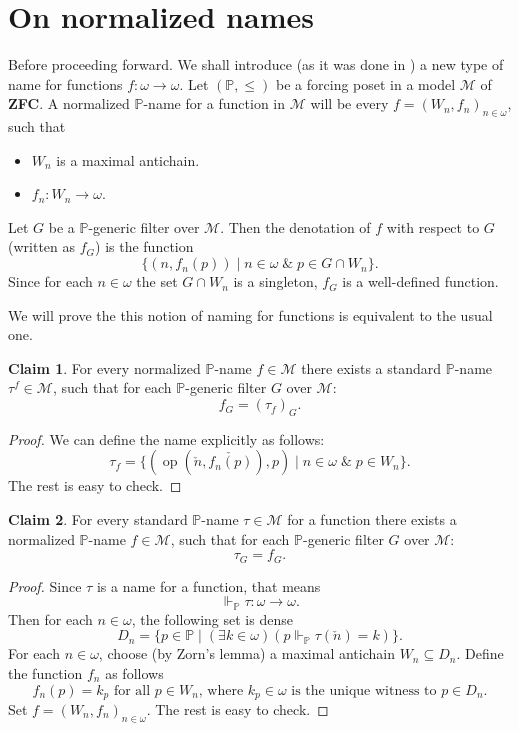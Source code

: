 \documentclass[12pt]{article}\usepackage[english]{babel}
\newcommand{\bbP}{\mathbb{P}}
\newcommand{\logand}{\; \& \;}
\newcommand{\calM}{\mathcal{M}}
\theoremstyle{definition}
\newtheorem{claim}{Claim}
\theoremstyle{remark}
\begin{document}
\newpage

\section*{On normalized names}

Before proceeding forward.
We shall introduce (as it was done in \cite{BlassShelah1989}) a new type of name for functions $f : \omega \longrightarrow \omega$.
Let $(\bbP, \leq)$ be a forcing poset in a model $\calM$ of \textbf{ZFC}.
A normalized $\bbP$-name for a function in $\calM$ will be every $f = (W_n, f_n)_{n \in \omega}$, such that
\begin{itemize}
  \item $W_n$ is a maximal antichain.
  \item $f_n : W_n \longrightarrow \omega$.
\end{itemize}
Let $G$ be a $\bbP$-generic filter over $\calM$.
Then the denotation of $f$ with respect to $G$ (written as $f_G$) is the function
\[
  \{ (n, f_n(p)) \mid n \in \omega \logand p \in G \cap W_n \}.
\]
Since for each $n \in \omega$ the set $G \cap W_n$ is a singleton, $f_G$ is a well-defined function.

We will prove the this notion of naming for functions is equivalent to the usual one.
\begin{claim}
  For every normalized $\bbP$-name $f \in \calM$ there exists a standard $\bbP$-name $\tau^{f} \in \calM$, such that for each $\bbP$-generic filter $G$ over $\calM$:
  \[
    f_G = (\tau_f)_G.
  \]
\end{claim}

\begin{proof}
  We can define the name explicitly as follows:
  \[
    \tau_f = \{ (\operatorname{op}(\check{n}, \check{f_n(p)}), p) \mid n \in \omega \logand p \in W_n \}.
  \]
  The rest is easy to check.
\end{proof}

\begin{claim}
  For every standard $\bbP$-name $\tau \in \calM$ for a function there exists a normalized $\bbP$-name $f \in \calM$, such that for each $\bbP$-generic filter $G$ over $\calM$:
  \[
    \tau_G = f_G.
  \]
\end{claim}

\begin{proof}
  Since $\tau$ is a name for a function, that means
  \[
    \Vdash_{\bbP} \tau : \omega \longrightarrow \omega.
  \]
  Then for each $n \in \omega$, the following set is dense
  \[
    D_n = \{ p \in \bbP \mid (\exists k \in \omega)(p \Vdash_\bbP \tau(\check{n}) = k) \}.
  \]
  For each $n \in \omega$, choose (by Zorn's lemma) a maximal antichain $W_n \subseteq D_n$.
  Define the function $f_n$ as follows
  \[
    f_n(p) = k_p \text{ for all } p \in W_n \text{, where } k_p \in \omega \text{ is the unique witness to } p \in D_n.
  \]
  Set $f = (W_n, f_n)_{n \in \omega}$.
  The rest is easy to check.
\end{proof}
\end{document}
